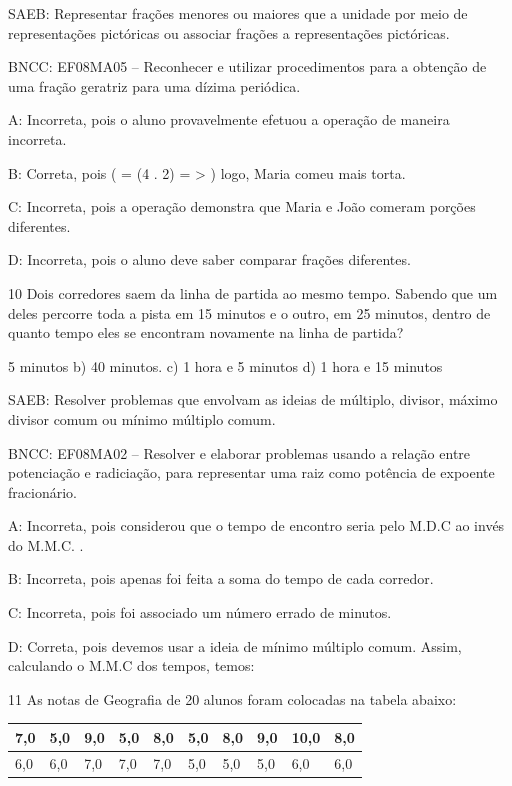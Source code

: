 {SAEB: Representar frações menores ou maiores que a unidade por meio de
representações pictóricas ou associar frações a representações
pictóricas.

BNCC: EF08MA05 -- Reconhecer e utilizar procedimentos para a obtenção de
uma fração geratriz para uma dízima periódica.

A: Incorreta, pois o aluno provavelmente efetuou a operação de maneira
incorreta.

B: Correta, pois
( =  {(4 . 2)} =  > )
logo, Maria comeu mais torta.

C: Incorreta, pois a operação demonstra que Maria e João comeram porções
diferentes.

D: Incorreta, pois o aluno deve saber comparar frações diferentes.

\num{10} Dois corredores saem da linha de partida ao mesmo tempo. Sabendo que
um deles percorre toda a pista em 15 minutos e o outro, em 25 minutos,
dentro de quanto tempo eles se encontram novamente na linha de partida?
\item 5 minutos b) 40 minutos. c) 1 hora e 5 minutos d) 1 hora e 15 minutos

SAEB: Resolver problemas que envolvam as ideias de múltiplo, divisor,
máximo divisor comum ou mínimo múltiplo comum.

BNCC: EF08MA02 -- Resolver e elaborar problemas usando a relação entre
potenciação e radiciação, para representar uma raiz como potência de
expoente fracionário.

A: Incorreta, pois considerou que o tempo de encontro seria pelo M.D.C
ao invés do M.M.C. .

B: Incorreta, pois apenas foi feita a soma do tempo de cada corredor.

C: Incorreta, pois foi associado um número errado de minutos.

D: Correta, pois devemos usar a ideia de mínimo múltiplo comum. Assim,
calculando o M.M.C dos tempos, temos:

\num{11} As notas de Geografia de 20 alunos foram colocadas na tabela abaixo:


\begin{longtable}[]{@{}llllllllll@{}}
\toprule
7,0 & 5,0 & 9,0 & 5,0 & 8,0 & 5,0 & 8,0 & 9,0 & 10,0 &
8,0\tabularnewline
\midrule
\endhead
6,0 & 6,0 & 7,0 & 7,0 & 7,0 & 5,0 & 5,0 & 5,0 & 6,0 & 6,0\tabularnewline
\bottomrule
\end{longtable}

}
